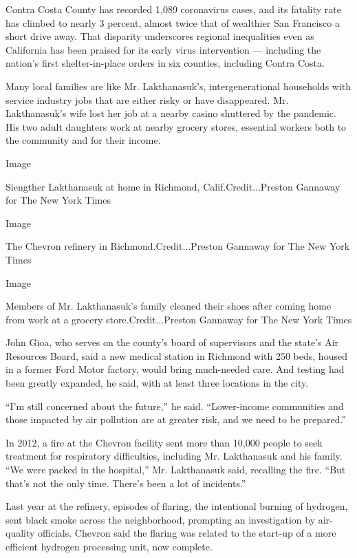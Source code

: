 Contra Costa County has recorded 1,089 coronavirus cases, and its
fatality rate has climbed to nearly 3 percent, almost twice that of
wealthier San Francisco a short drive away. That disparity underscores
regional inequalities even as California has been praised for its early
virus intervention --- including the nation's first shelter-in-place
orders in six counties, including Contra Costa.

Many local families are like Mr. Lakthanasuk's, intergenerational
households with service industry jobs that are either risky or have
disappeared. Mr. Lakthanasuk's wife lost her job at a nearby casino
shuttered by the pandemic. His two adult daughters work at nearby
grocery stores, essential workers both to the community and for their
income.

Image

Siengther Lakthanasuk at home in Richmond, Calif.Credit...Preston
Gannaway for The New York Times

Image

The Chevron refinery in Richmond.Credit...Preston Gannaway for The New
York Times

Image

Members of Mr. Lakthanasuk's family cleaned their shoes after coming
home from work at a grocery store.Credit...Preston Gannaway for The New
York Times

John Gioa, who serves on the county's board of supervisors and the
state's Air Resources Board, said a new medical station in Richmond with
250 beds, housed in a former Ford Motor factory, would bring much-needed
care. And testing had been greatly expanded, he said, with at least
three locations in the city.

``I'm still concerned about the future,'' he said. ``Lower-income
communities and those impacted by air pollution are at greater risk, and
we need to be prepared.''

In 2012, a fire at the Chevron facility sent more than 10,000 people to
seek treatment for respiratory difficulties, including Mr. Lakthanasuk
and his family. ``We were packed in the hospital,'' Mr. Lakthanasuk
said, recalling the fire. ``But that's not the only time. There's been a
lot of incidents.''

Last year at the refinery, episodes of flaring, the intentional burning
of hydrogen, sent black smoke across the neighborhood, prompting an
investigation by air-quality officials. Chevron said the flaring was
related to the start-up of a more efficient hydrogen processing unit,
now complete.

